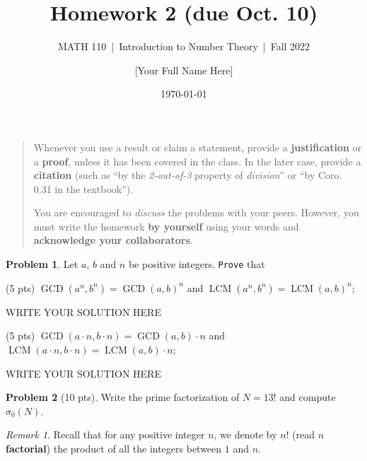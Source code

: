 \documentclass[11pt]{article}
\title{Homework 2 (due Oct. 10)}
\author{[Your Full Name Here]}
\subtitle{MATH 110~|~Introduction to Number Theory~|~Fall 2022}
\date{\today}
\theoremstyle{plain}
\theoremstyle{definition}
\newtheorem{problem}{Problem}
\theoremstyle{remark}
\newtheorem*{remark}{Remark}
\numberwithin{equation}{problem}
\DeclareMathOperator*\GCD{GCD}
\DeclareMathOperator*\LCM{LCM}
\begin{document}
\maketitle

\begin{quotation}
	Whenever you use a result or claim a statement, provide a \textbf{justification} or a \textbf{proof}, unless it has been covered in the class. In the later case, provide a \textbf{citation} (such as ``by the \emph{2-out-of-3} property of \emph{division}'' or ``by Coro. 0.31 in the textbook'').

	You are encouraged to \emph{discuss} the problems with your peers. However, you must write the homework \textbf{by yourself} using your words and \textbf{acknowledge your collaborators}.
\end{quotation}

\begin{problem}
	Let $a$, $b$ and $n$ be positive integers. \texttt{Prove} that 
	\begin{listinprob}
		\item (5 pts) $\GCD(a^n,b^n) = \GCD(a,b)^n$ and $\LCM(a^n,b^n) = \LCM(a,b)^n$;
		
\begin{solution} %
WRITE YOUR SOLUTION HERE
\end{solution}\clearpage %

		\item (5 pts) $\GCD(a\cdot n,b\cdot n) = \GCD(a,b)\cdot n$ and $\LCM(a\cdot n,b\cdot n) = \LCM(a,b)\cdot n$;
	\end{listinprob}
	
\begin{solution} %
WRITE YOUR SOLUTION HERE
\end{solution}\clearpage %
\end{problem}






\begin{problem}[10 pts]
	Write the prime factorization of $N = 13!$ and compute $\sigma_{0}(N)$.
	\begin{remark}
		Recall that for any positive integer $n$, we denote by $n!$ (read \textbf{$n$ factorial}) the product of all the integers between $1$ and $n$.
	\end{remark}
\end{problem}
\end{document}

